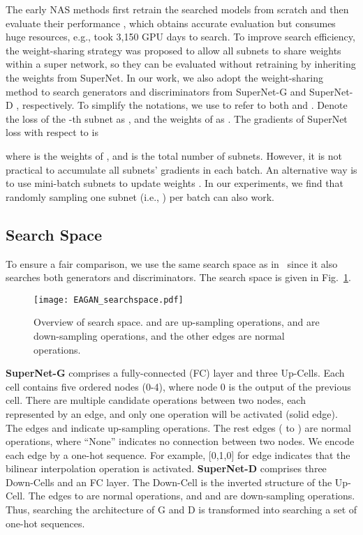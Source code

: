 \documentclass[runningheads]{llncs}
\begin{document}
The early NAS methods first retrain the searched models from scratch and then evaluate their performance \cite{nas2016,amoebanet}, which obtains accurate evaluation but consumes huge resources, e.g., \cite{amoebanet} took 3,150 GPU days to search. To improve search efficiency, the weight-sharing strategy \cite{enas} was proposed to allow all subnets to share weights within a super network, so they can be evaluated without retraining by inheriting the weights from SuperNet. In our work, we also adopt the weight-sharing method to search generators and discriminators from SuperNet-G  and SuperNet-D , respectively. To simplify the notations, we use  to refer to both  and . Denote the loss of the -th subnet  as , and the weights of  as . The gradients of SuperNet loss  with respect to  is





\noindent where  is the weights of , and  is the total number of subnets. However, it is not practical to accumulate all subnets' gradients in each batch. An alternative way is to use mini-batch subnets to update weights . In our experiments, we find that randomly sampling one subnet (i.e., ) per batch can also work.


\subsection{Search Space}\label{sec:searchspace}

To ensure a fair comparison, we use the same search space as in~\cite{Adversarialnas} since it also searches both generators and discriminators. The search space is given in Fig.~\ref{fig:searchspace}.











\begin{figure}
    \centering
    \texttt{[image: EAGAN\_searchspace.pdf]}
    \caption{Overview of search space.  and  are up-sampling operations,  and  are down-sampling operations, and the other edges are normal operations.}
    \label{fig:searchspace}
\end{figure}

\textbf{SuperNet-G}  comprises a fully-connected (FC) layer and three Up-Cells. Each cell contains five ordered nodes (0-4), where node 0 is the output of the previous cell. There are multiple candidate operations between two nodes, each represented by an edge, and only one operation will be activated (solid edge). The edges  and  indicate up-sampling operations. The rest edges ( to ) are normal operations, where ``None'' indicates no connection between two nodes. We encode each edge by a one-hot sequence. For example, [0,1,0] for edge  indicates that the bilinear interpolation operation is activated. \textbf{SuperNet-D}  comprises three Down-Cells and an FC layer. The Down-Cell is the inverted structure of the Up-Cell. The edges  to  are normal operations, and  and  are down-sampling operations. Thus, searching the architecture of G and D is transformed into searching a set of one-hot sequences. 
\end{document}
